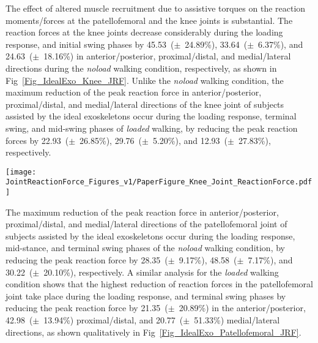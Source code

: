 \documentclass[10pt,letterpaper]{article}
\begin{document}
The effect of altered muscle recruitment due to assistive torques on the reaction moments/forces at the patellofemoral and the knee joints is substantial. The reaction forces at the knee joints decrease considerably during the loading response, and initial swing phases by 45.53~($\pm$~24.89\%), 33.64~($\pm$~6.37\%), and 24.63~($\pm$~18.16\%) in anterior/posterior, proximal/distal, and medial/lateral directions during the \emph{noload} walking condition, respectively, as shown in Fig~\ref{Fig_IdealExo_Knee_JRF}. Unlike the \emph{noload} walking condition, the maximum reduction of the peak reaction force in anterior/posterior, proximal/distal, and medial/lateral directions of the knee joint of subjects assisted by the ideal exoskeletons occur during the loading response, terminal swing, and mid-swing phases of \emph{loaded} walking, by reducing the peak reaction forces by 22.93~($\pm$~26.85\%), 29.76~($\pm$~5.20\%), and 12.93~($\pm$~27.83\%), respectively.

\begin{figure*}[ht]
	\centering
	\texttt{[image: JointReactionForce\_Figures\_v1/PaperFigure\_Knee\_Joint\_ReactionForce.pdf]}
	\vspace{-3mm}
	\caption{{\small\textbf{Reaction forces of knee joint of assisted and unassisted subjects.} The knee joint reaction forces of unassisted subjects under \emph{noload} (green) and \emph{loaded} (black) walking conditions, and assisted subjects by bi-articular/mono-articular exoskeleton during \textit{noload} (rose red/blue) and \textit{loaded} (dark rose red/dark blue) walking conditions are shown in anterior/posterior, proximal/distal, and medial/lateral directions. The curves are averaged over 7 subjects with 3 trials.}}
	\label{Fig_IdealExo_Knee_JRF}
\end{figure*}

The maximum reduction of the peak reaction force in anterior/posterior, proximal/distal, and medial/lateral directions of the patellofemoral joint of subjects assisted by the ideal exoskeletons occur during the loading response, mid-stance, and terminal swing phases of the \emph{noload} walking condition, by reducing the peak reaction force by 28.35~($\pm$~9.17\%), 48.58~($\pm$~7.17\%), and 30.22~($\pm$~20.10\%), respectively. A similar analysis for the \emph{loaded} walking condition shows that the highest reduction of reaction forces in the patellofemoral joint take place during the loading response, and terminal swing phases by reducing the peak reaction force by 21.35~($\pm$~20.89\%) in the anterior/posterior, 42.98~($\pm$~13.94\%) proximal/distal, and 20.77~($\pm$~51.33\%) medial/lateral directions, as shown qualitatively in Fig~\ref{Fig_IdealExo_Patellofemoral_JRF}.
\end{document}
